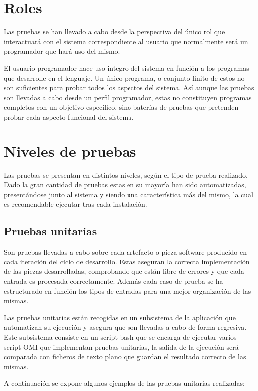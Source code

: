 \section{Roles}
Las pruebas se han llevado a cabo desde la perspectiva del único rol que interactuará con el sistema correspondiente al usuario que 
normalmente será un programador que hará uso del mismo.

El usuario programador hace uso integro del sistema en función a los programas que desarrolle en el lenguaje. Un único programa, o conjunto finito de estos no 
son suficientes para probar todos los aspectos del sistema. Así aunque las pruebas son llevadas a cabo desde un perfil programador, estas no constituyen programas 
completos con un objetivo específico, sino baterías de pruebas que pretenden probar cada aspecto funcional del sistema. 

\section{Niveles de pruebas}
Las pruebas se presentan en distintos niveles, según el tipo de prueba realizado. Dado la gran cantidad de pruebas estas en su mayoría han sido automatizadas, presentándose
junto al sistema y siendo una característica más del mismo, la cual es recomendable ejecutar tras cada instalación. 

\subsection{Pruebas unitarias}
Son pruebas llevadas a cabo sobre cada artefacto o pieza software producido en cada iteración del ciclo de desarrollo. Estas aseguran la correcta implementación
de las piezas desarrolladas, comprobando que están libre de errores y que cada entrada es procesada correctamente. Además cada caso de prueba se ha estructurado en función 
los tipos de entradas para una mejor organización de las mismas. 
 
Las pruebas unitarias están recogidas en un subsistema de la aplicación que automatizan su ejecución y asegura que son llevadas a cabo de forma regresiva. Este subsistema consiste en
un script bash que se encarga de ejecutar varios script OMI que implementan pruebas unitarias, la salida de la ejecución será comparada con ficheros de texto plano que guardan el resultado correcto de
las mismas. 

A continuación se expone algunos ejemplos de las pruebas unitarias realizadas:


